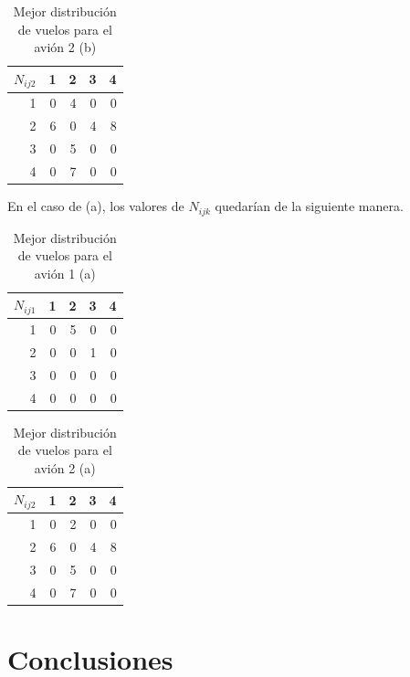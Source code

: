 \documentclass[12pt]{article}
\begin{document}
\begin{table}[ht!]
    \centering
    \begin{tabular}{r|r|r|r|r}
        $N_{ij2}$%
               &   1  &   2  &   3  &   4\\
            \hline
            \hline
             1 & 0 & 4 & 0 & 0\\
             2 & 6 & 0 & 4 & 8\\
             3 & 0 & 5 & 0 & 0\\
             4 & 0 & 7 & 0 & 0\\
    \end{tabular}
    \caption{Mejor distribución de vuelos para el avión 2 (b)}
    \label{tab:nij2b}
\end{table}

En el caso de (a), los valores de $N_{ijk}$ quedarían de la siguiente manera.

\begin{table}[ht!]
    \centering
    \begin{tabular}{r|r|r|r|r}
        $N_{ij1}$%
               &   1  &   2  &   3  &   4\\
            \hline
            \hline
             1 & 0 & 5 & 0 & 0\\
             2 & 0 & 0 & 1 & 0\\
             3 & 0 & 0 & 0 & 0\\
             4 & 0 & 0 & 0 & 0\\
    \end{tabular}
    \caption{Mejor distribución de vuelos para el avión 1 (a)}
    \label{tab:nij1a}
\end{table}

\begin{table}[ht!]
    \centering
    \begin{tabular}{r|r|r|r|r}
        $N_{ij2}$%
               &   1  &   2  &   3  &   4\\
            \hline
            \hline
             1 & 0 & 2 & 0 & 0\\
             2 & 6 & 0 & 4 & 8\\
             3 & 0 & 5 & 0 & 0\\
             4 & 0 & 7 & 0 & 0\\
    \end{tabular}
    \caption{Mejor distribución de vuelos para el avión 2 (a)}
    \label{tab:nij2a}
\end{table}

\section{Conclusiones}
\end{document}
